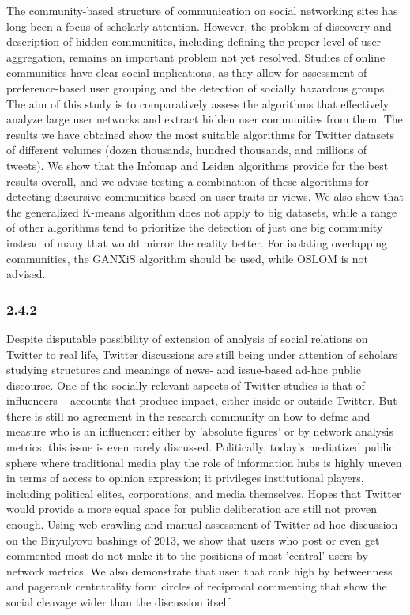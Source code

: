 The community-based structure of communication on social networking sites has long been a focus of scholarly attention. However, the problem of discovery and description of hidden communities, including defining the proper level of user aggregation, remains an important problem not yet resolved. Studies of online communities have clear social implications, as they allow for assessment of preference-based user grouping and the detection of socially hazardous groups. The aim of this study is to comparatively assess the algorithms that effectively analyze large user networks and extract hidden user communities from them. The results we have obtained show the most suitable algorithms for Twitter datasets of different volumes (dozen thousands, hundred thousands, and millions of tweets). We show that the Infomap and Leiden algorithms provide for the best results overall, and we advise testing a combination of these algorithms for detecting discursive communities based on user traits or views. We also show that the generalized K-means algorithm does not apply to big datasets, while a range of other algorithms tend to prioritize the detection of just one big community instead of many that would mirror the reality better. For isolating overlapping communities, the GANXiS algorithm should be used, while OSLOM is not advised. 

\subsubsection{2.4.2}

Despite disputable possibility of extension of analysis of social relations on Twitter to real life, Twitter discussions are still being under attention of scholars studying structures and meanings of news- and issue-based ad-hoc public discourse. One of the socially relevant aspects of Twitter studies is that of influencers -- accounts that produce impact, either inside or outside Twitter. But there is still no agreement in the research community on how to defme and measure who is an influencer: either by 'absolute figures' or by network analysis metrics; this issue is even rarely discussed. Politically, today's mediatized public sphere where traditional media play the role of information hubs is highly uneven in terms of access to opinion expression; it privileges institutional players, including political elites, corporations, and media themselves. Hopes that Twitter would provide a more equal space for public deliberation are still not proven enough. Using web crawling and manual assessment of Twitter ad-hoc discussion on the Biryulyovo bashings of 2013, we show that users who post or even get commented most do not make it to the positions of most 'central' users by network metrics. We also demonstrate that usen that rank high by betweenness and pagerank centntrality form circles of reciprocal commenting that show the social cleavage wider than the discussion itself.

